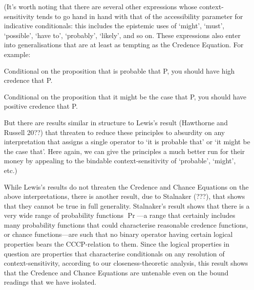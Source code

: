 \documentclass[leqno, 11pt, a5paper, openany]{article}
\DeclareMathOperator{\prob}{Pr}
\begin{document}
(It's worth noting that there are several other expressions whose context-sensitivity tends to go hand in hand with that of the accessibility parameter for indicative conditionals: this includes the epistemic uses of ‘might’, ‘must’, ‘possible’, ‘have to’, ‘probably’, ‘likely’, and so on. These expressions also enter into generalisations that are at least as tempting as the Credence Equation. For example:
\begin{prop}
	\item
	Conditional on the proposition that is probable that P, you should have high credence that P.
	\item
	Conditional on the proposition that it might be the case that P, you should have positive credence that P.
\end{prop}
But there are results similar in structure to Lewis's result (Hawthorne and Russell 20??) that threaten to reduce these principles to absurdity on any interpretation that assigns a single operator to ‘it is probable that’ or ‘it might be the case that’. Here again, we can give the principles a much better run for their money by appealing to the bindable context-sensitivity of ‘probable’, ‘might’, etc.)

While Lewis's results do not threaten the Credence and Chance Equations on the above interpretations, there is another result, due to Stalnaker (???), that shows that they cannot be true in full generality. Stalnaker's result shows that there is a very wide range of probability functions $\prob$---a range that certainly includes many probability functions that could characterise reasonable credence functions, or chance functions---are such that no binary operator having certain logical properties bears the CCCP-relation to them. Since the logical properties in question are properties that characterise conditionals on any resolution of context-sensitivity, according to our closeness-theoretic analysis, this result shows that the Credence and Chance Equations are untenable even on the bound readings that we have isolated.
\end{document}

